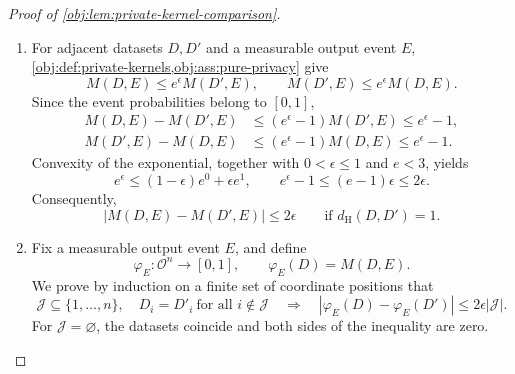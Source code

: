 \begin{proof}[Proof of \cref{obj:lem:private-kernel-comparison}]
\begin{enumerate}
\item For adjacent datasets \(D,D'\) and a measurable output event \(E\), \cref{obj:def:private-kernels,obj:ass:pure-privacy} give
\[
M(D,E)\le e^\epsilon M(D',E),
\qquad
M(D',E)\le e^\epsilon M(D,E).
\]
Since the event probabilities belong to \([0,1]\),
\[
\begin{aligned}
M(D,E)-M(D',E)
&\le (e^\epsilon-1)M(D',E)\le e^\epsilon-1,\\
M(D',E)-M(D,E)
&\le (e^\epsilon-1)M(D,E)\le e^\epsilon-1.
\end{aligned}
\]
Convexity of the exponential, together with \(0<\epsilon\le1\) and \(e<3\), yields
\[
e^\epsilon
\le (1-\epsilon)e^0+\epsilon e^1,
\qquad
e^\epsilon-1\le (e-1)\epsilon\le2\epsilon.
\]
Consequently,
\[
|M(D,E)-M(D',E)|\le2\epsilon
\qquad\text{if }d_{\mathrm H}(D,D')=1.
\]

\item Fix a measurable output event \(E\), and define
\[
\varphi_E:\mathcal O^n\longrightarrow[0,1],
\qquad
\varphi_E(D)=M(D,E).
\]
We prove by induction on a finite set of coordinate positions that
\[
\mathcal J\subseteq\{1,\ldots,n\},
\quad
D_i=D'_i\ \text{for all }i\notin\mathcal J
\quad\Longrightarrow\quad
|\varphi_E(D)-\varphi_E(D')|
\le2\epsilon|\mathcal J|.
\]
For \(\mathcal J=\varnothing\), the datasets coincide and both sides of the inequality are zero.


\end{enumerate}
\end{proof}
